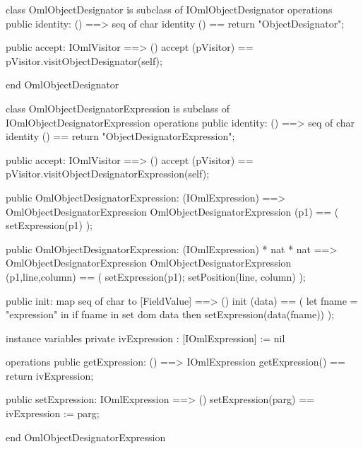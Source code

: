 \begin{vdm_al}
class OmlObjectDesignator is subclass of IOmlObjectDesignator
operations
  public identity: () ==> seq of char
  identity () == return "ObjectDesignator";

  public accept: IOmlVisitor ==> ()
  accept (pVisitor) == pVisitor.visitObjectDesignator(self);

end OmlObjectDesignator
\end{vdm_al}
\begin{vdm_al}
class OmlObjectDesignatorExpression is subclass of IOmlObjectDesignatorExpression
operations
  public identity: () ==> seq of char
  identity () == return "ObjectDesignatorExpression";

  public accept: IOmlVisitor ==> ()
  accept (pVisitor) == pVisitor.visitObjectDesignatorExpression(self);

  public OmlObjectDesignatorExpression:
    (IOmlExpression) ==> OmlObjectDesignatorExpression
  OmlObjectDesignatorExpression (p1) == 
    ( setExpression(p1) );

  public OmlObjectDesignatorExpression:
    (IOmlExpression) *
    nat *
    nat ==> OmlObjectDesignatorExpression
  OmlObjectDesignatorExpression (p1,line,column) == 
    ( setExpression(p1);
      setPosition(line, column) );

  public init: map seq of char to [FieldValue] ==> ()
  init (data) ==
    ( let fname = "expression" in
        if fname in set dom data
        then setExpression(data(fname)) );

instance variables
  private ivExpression : [IOmlExpression] := nil

operations
  public getExpression: () ==> IOmlExpression
  getExpression() == return ivExpression;

  public setExpression: IOmlExpression ==> ()
  setExpression(parg) == ivExpression := parg;

end OmlObjectDesignatorExpression
\end{vdm_al}

